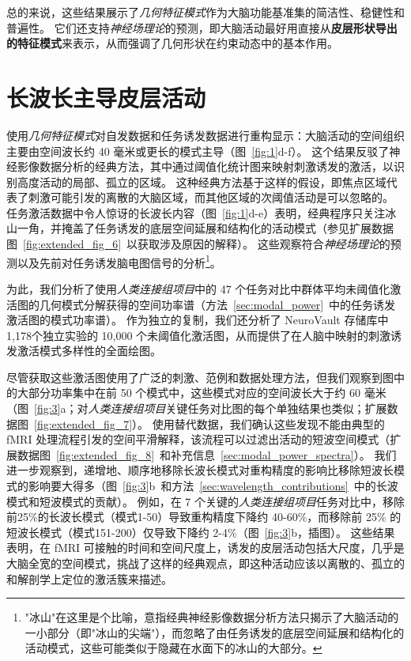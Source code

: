 \documentclass[lang=cn,a4paper,newtx,citestyle=gb7714-2015, bibstyle=gb7714-2015]{elegantpaper}
\begin{document}
总的来说，这些结果展示了\textit{几何特征模式}作为大脑功能基准集的简洁性、稳健性和普遍性。
它们还支持\textit{神经场理论}的预测，即大脑活动最好用直接从\textbf{皮层形状导出的特征模式}来表示，从而强调了几何形状在约束动态中的基本作用。




\section{长波长主导皮层活动}

使用\textit{几何特征模式}对自发数据和任务诱发数据进行重构显示：大脑活动的空间组织主要由空间波长约 40 毫米或更长的模式主导（图~\ref{fig:1}d-f）。
这个结果反驳了神经影像数据分析的经典方法，其中通过阈值化统计图来映射刺激诱发的激活，以识别高度活动的局部、孤立的区域。
这种经典方法基于这样的假设，即焦点区域代表了刺激可能引发的离散的大脑区域，而其他区域的次阈值活动是可以忽略的。
任务激活数据中令人惊讶的长波长内容（图~\ref{fig:1}d-e）表明，经典程序只关注冰山一角，并掩盖了任务诱发的底层空间延展和结构化的活动模式（参见扩展数据图~\ref{fig:extended_fig_6}~以获取涉及原因的解释）。
这些观察符合\textit{神经场理论}的预测以及先前对任务诱发脑电图信号的分析\footnote{"冰山"在这里是个比喻，意指经典神经影像数据分析方法只揭示了大脑活动的一小部分（即"冰山的尖端"），而忽略了由任务诱发的底层空间延展和结构化的活动模式，这些可能类似于隐藏在水面下的冰山的大部分。}。


为此，我们分析了使用\textit{人类连接组项目}中的 47 个任务对比中群体平均未阈值化激活图的几何模式分解获得的空间功率谱（方法~\ref{sec:modal_power}~中的任务诱发激活图的模式功率谱）。
作为独立的复制，我们还分析了 NeuroVault 存储库中1,178个独立实验的 10,000 个未阈值化激活图，从而提供了在人脑中映射的刺激诱发激活模式多样性的全面绘图。


尽管获取这些激活图使用了广泛的刺激、范例和数据处理方法，但我们观察到图中的大部分功率集中在前 50 个模式中，这些模式对应的空间波长大于约 60 毫米（图~\ref{fig:3}a；对\textit{人类连接组项目}关键任务对比图的每个单独结果也类似；扩展数据图~\ref{fig:extended_fig_7}）。
使用替代数据，我们确认这些发现不能由典型的 fMRI 处理流程引发的空间平滑解释，该流程可以过滤出活动的短波空间模式（扩展数据图~\ref{fig:extended_fig_8}~和补充信息~\ref{sec:modal_power_spectra}）。
我们进一步观察到，递增地、顺序地移除长波长模式对重构精度的影响比移除短波长模式的影响要大得多（图~\ref{fig:3}b~和方法~\ref{sec:wavelength_contributions}~中的长波模式和短波模式的贡献）。
例如，在 7 个关键的\textit{人类连接组项目}任务对比中，移除前25\%的长波长模式（模式1-50）导致重构精度下降约 40-60\%，而移除前 25\% 的短波长模式（模式151-200）仅导致下降约 2-4\%（图~\ref{fig:3}b，插图）。
这些结果表明，在 fMRI 可接触的时间和空间尺度上，诱发的皮层活动包括大尺度，几乎是大脑全宽的空间模式，挑战了这样的经典观点，即这种活动应该以离散的、孤立的和解剖学上定位的激活簇来描述。
\end{document}
